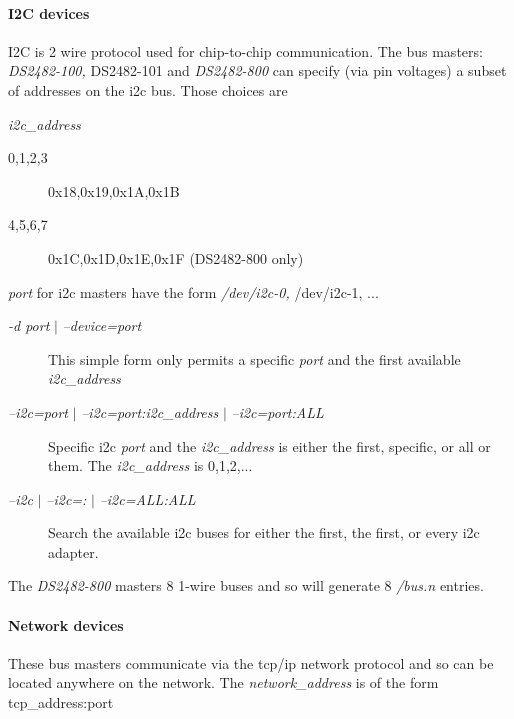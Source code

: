 \paragraph*{ I2C
devices}
I2C is  2 wire protocol used for chip-to-chip communication. The bus
masters: \textit{DS2482-100,} DS2482-101 and \textit{DS2482-800} can specify (via pin voltages)
a subset of addresses on the i2c bus. Those choices are 

\textit{i2c\_address} \begin{description}
\item [0,1,2,3
] 0x18,0x19,0x1A,0x1B 
\item [4,5,6,7 ] 0x1C,0x1D,0x1E,0x1F (DS2482-800 only) 
\end{description}


\textit{port} for
i2c masters have the form  \textit{/dev/i2c-0,} /dev/i2c-1, ... \begin{description}
\item [\textit{-d port} $|$ \textit{--device=port }] This
simple form only permits a specific  \textit{port}  and the first available \textit{i2c\_address}

\item [\textit{--i2c=port} $|$ \textit{--i2c=port:i2c\_address} $|$ \textit{--i2c=port:ALL }] Specific i2c \textit{port} and the
\textit{i2c\_address} is either the first, specific, or all or them. The  \textit{i2c\_address}
is 0,1,2,... 
\item [\textit{--i2c} $|$ \textit{--i2c=:} $|$ \textit{--i2c=ALL:ALL }] Search the available i2c buses for either
the first, the first, or every i2c adapter. 
\end{description}


The \textit{DS2482-800} masters 8 1-wire
buses and so will generate 8 \textit{/bus.n} entries. 
\paragraph*{ Network devices}
These bus masters
communicate via the tcp/ip network protocol and so can be located anywhere
on the network. The \textit{network\_address} is of the form tcp\_address:port 

